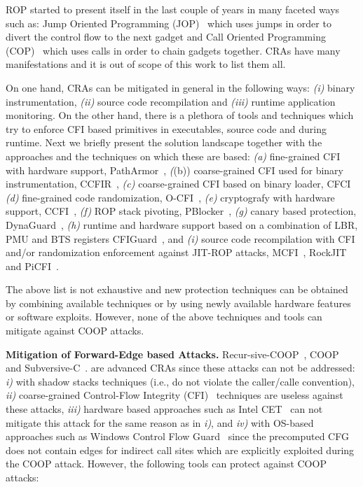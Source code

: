 ROP started to present itself in the last couple of years in many faceted ways such as:
Jump Oriented Programming (JOP)~\cite{JOP1, JOP2, JOP3} which uses jumps in order to divert the control flow to the next gadget and 
Call Oriented Programming (COP)~\cite{rop:carlini} which uses calls in order to chain gadgets together.
CRAs have many manifestations and it is out of scope of this work to list them all.

On one hand, CRAs can be mitigated in general in the following ways: 
\textit{(i)} binary instrumentation,
\textit{(ii)} source code recompilation and 
\textit{(iii)} runtime application monitoring.
On the other hand, there is a plethora of tools and techniques which try to enforce CFI based
primitives in executables, source code and during runtime. Next we briefly
present the solution landscape together with the approaches and the techniques on which these are based:
\textit{(a)} fine-grained CFI with hardware support, PathArmor~\cite{veen:cfi},
\textit((b)) coarse-grained CFI used for binary instrumentation, CCFIR~\cite{ccfir:zhang},
\textit{(c)} coarse-grained CFI based on binary loader, CFCI~\cite{cfci:zhang}
\textit{(d)} fine-grained code randomization, O-CFI~\cite{mohan:opaque},
\textit{(e)} cryptografy with hardware support, CCFI~\cite{ccfi:jose},
\textit{(f)} ROP stack pivoting, PBlocker~\cite{pblocker:prakash},
\textit{(g)} canary based protection, DynaGuard~\cite{dynaguard:petsios},
\textit{(h)} runtime and hardware support based on a combination of LBR, PMU and BTS registers CFIGuard~\cite{cfiguard:yuan}, and
\textit{(i)} source code recompilation with CFI and/or randomization enforcement against JIT-ROP attacks, MCFI~\cite{mcfi:niu}, 
RockJIT~\cite{rockjit:niu} and PiCFI~\cite{perinput:niu}.

The above list is not exhaustive and new protection techniques can be obtained by combining available techniques
or by using newly available hardware features or software exploits. However, none of the above techniques and tools 
can mitigate against COOP attacks.

\textbf{Mitigation of Forward-Edge based Attacks.}
\label{Mitigation of Advanced Code-Reuse Attacks}
Recur-sive-COOP~\cite{crane:readactor++}, COOP~\cite{schuster:coop} and Subversive-C~\cite{subversive-c:lettner}.
are advanced CRAs since these attacks can not be addressed:
\textit{i)}  with shadow stacks techniques (i.e., do not violate the caller/calle convention), 
\textit{ii)} coarse-grained Control-Flow Integrity (CFI)~\cite{abadi:cfi2, abadi:cfi} techniques are useless against these attacks, 
\textit{iii)} hardware based approaches such as Intel CET~\cite{intel:cet} can not mitigate this attack for the same reason as in \textit{i)}, and 
\textit{iv)} with OS-based approaches such as Windows Control Flow Guard~\cite{windows:cfguard} 
since the precomputed CFG does not contain edges for indirect call sites which are explicitly exploited during the COOP attack.
However, the following tools can protect against COOP attacks:

